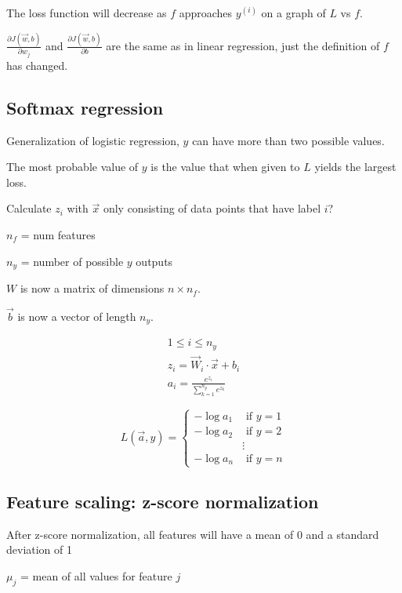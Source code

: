 \documentclass[12pt]{article}
\begin{document}
The loss function will decrease as $f$ approaches $y^{(i)}$ on a graph of $L$ vs $f$.

$\frac{\partial J(\vec{w},b)}{\partial w_j}$ and $\frac{\partial J(\vec{w},b)}{\partial b}$ are the same as in linear regression, just the definition of $f$ has changed.

\subsection{Softmax regression}

Generalization of logistic regression, $y$ can have more than two possible values.

The most probable value of $y$ is the value that when given to $L$ yields the largest loss.

Calculate $z_i$ with $\vec{x}$ only consisting of data points that have label $i$?

$n_f$ = num features

$n_y$ = number of possible $y$ outputs

$W$ is now a matrix of dimensions $n \times n_f$.

$\vec{b}$ is now a vector of length $n_y$.

\begin{gather*}
1 \leq i \leq n_y\\
z_i = \vec{W}_i \cdot \vec{x} + b_i\\
a_i = \frac{e^{z_i}}{\sum_{k=1}^{n_y} e^{z_k}}
\end{gather*}

\begin{equation}
L(\vec{a}, y) =
  \left\{
    \begin{aligned}
    -\log a_1 &\text{ if } y = 1\\
    -\log a_2 &\text{ if } y = 2\\
    & \vdots\\
    -\log a_n &\text{ if } y = n
    \end{aligned}
   \right.
\end{equation}

\subsection{Feature scaling: z-score normalization}

After z-score normalization, all features will have a mean of 0 and a standard deviation of 1

$\mu_j$ = mean of all values for feature $j$
\end{document}
